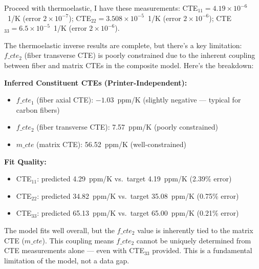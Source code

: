 \documentclass[preprint,review,10pt,number]{elsarticle}
\begin{document}
\begin{center}
\begin{tcolorbox}
\vspace{8pt}
\begin{tcolorbox}[
    breakable,
    colback=gray!8, colframe=gray!60, boxrule=0.5pt, arc=2pt,
    left=6pt, right=6pt, top=4pt, bottom=4pt,
    title={\textbf{User}}, fonttitle=\small\bfseries, coltitle=black
]
\small
Proceed with thermoelastic, I have these measurements: CTE$_{11} = 4.19\times10^{-6}$~1/K (error $2\times10^{-7}$); CTE$_{22} = 3.508\times10^{-5}$~1/K (error $2\times10^{-6}$); CTE$_{33} = 6.5\times10^{-5}$~1/K (error $2\times10^{-6}$).
\end{tcolorbox}
\vspace{4pt}
\begin{tcolorbox}[
    breakable,
    colback=gray!3, colframe=gray!40, boxrule=0.5pt, arc=2pt,
    left=6pt, right=6pt, top=4pt, bottom=4pt,
    title={\textbf{\texttt{MateriAl}} \hfill \texttt{\footnotesize\textcolor{gray!70!black}{\ding{110}\ run\_thermoelastic\_inverse}}},
    fonttitle=\small\bfseries, coltitle=black
]
\small
The thermoelastic inverse results are complete, but there's a key limitation: $f\_cte_2$ (fiber transverse CTE) is poorly constrained due to the inherent coupling between fiber and matrix CTEs in the composite model. Here's the breakdown:
\vspace{4pt}

\textbf{Inferred Constituent CTEs (Printer-Independent):}
\begin{itemize}[leftmargin=1.2em, itemsep=0pt, topsep=2pt]
\item $f\_cte_1$ (fiber axial CTE): $-1.03$~ppm/K (slightly negative --- typical for carbon fibers)
\item $f\_cte_2$ (fiber transverse CTE): 7.57~ppm/K (poorly constrained)
\item $m\_cte$ (matrix CTE): 56.52~ppm/K (well-constrained)
\end{itemize}

\textbf{Fit Quality:}
\begin{itemize}[leftmargin=1.2em, itemsep=0pt, topsep=2pt]
\item CTE$_{11}$: predicted 4.29~ppm/K vs.\ target 4.19~ppm/K (2.39\% error)
\item CTE$_{22}$: predicted 34.82~ppm/K vs.\ target 35.08~ppm/K (0.75\% error)
\item CTE$_{33}$: predicted 65.13~ppm/K vs.\ target 65.00~ppm/K (0.21\% error)
\end{itemize}
\vspace{4pt}
The model fits well overall, but the $f\_cte_2$ value is inherently tied to the matrix CTE ($m\_cte$). This coupling means $f\_cte_2$ cannot be uniquely determined from CTE measurements alone --- even with CTE$_{33}$ provided. This is a fundamental limitation of the model, not a data gap.
\vspace{4pt}


\end{tcolorbox}
\end{tcolorbox}
\end{center}
\end{document}
